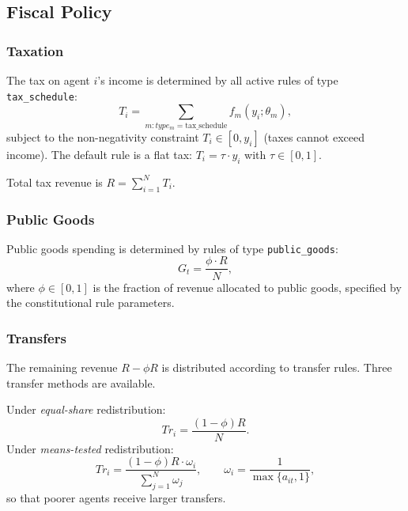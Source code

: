 \documentclass[12pt]{article}
\begin{document}
\subsection{Fiscal Policy}\label{sec:fiscal}

\subsubsection{Taxation}

The tax on agent $i$'s income is determined by all active rules of type \texttt{tax\_schedule}:
\begin{equation}\label{eq:taxation}
  T_i = \sum_{m: type_m = \text{tax\_schedule}} f_m(y_i; \theta_m),
\end{equation}
subject to the non-negativity constraint $T_i \in [0, y_i]$ (taxes cannot exceed income). The default rule is a flat tax: $T_i = \tau \cdot y_i$ with $\tau \in [0, 1]$.

Total tax revenue is $R = \sum_{i=1}^{N} T_i$.

\subsubsection{Public Goods}

Public goods spending is determined by rules of type \texttt{public\_goods}:
\begin{equation}\label{eq:public_goods}
  G_t = \frac{\phi \cdot R}{N},
\end{equation}
where $\phi \in [0, 1]$ is the fraction of revenue allocated to public goods, specified by the constitutional rule parameters.

\subsubsection{Transfers}

The remaining revenue $R - \phi R$ is distributed according to transfer rules. Three transfer methods are available.

Under \emph{equal-share} redistribution:
\begin{equation}\label{eq:equal_transfer}
  Tr_i = \frac{(1 - \phi) R}{N}.
\end{equation}
Under \emph{means-tested} redistribution:
\begin{equation}\label{eq:means_tested}
  Tr_i = \frac{(1 - \phi) R \cdot \omega_i}{\sum_{j=1}^{N} \omega_j}, \qquad \omega_i = \frac{1}{\max\{a_{it}, 1\}},
\end{equation}
so that poorer agents receive larger transfers.
\end{document}
